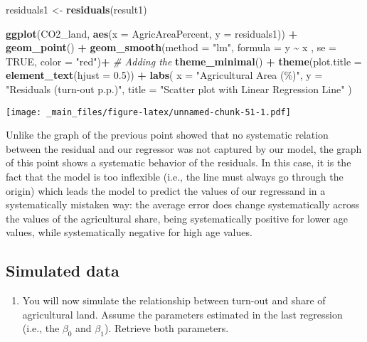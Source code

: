 \documentclass[
]{book}
\newenvironment{Shaded}{\begin{snugshade}}{\end{snugshade}}
\newcommand{\AttributeTok}[1]{\textcolor[rgb]{0.13,0.29,0.53}{#1}}
\newcommand{\CommentTok}[1]{\textcolor[rgb]{0.56,0.35,0.01}{\textit{#1}}}
\newcommand{\ConstantTok}[1]{\textcolor[rgb]{0.56,0.35,0.01}{#1}}
\newcommand{\FloatTok}[1]{\textcolor[rgb]{0.00,0.00,0.81}{#1}}
\newcommand{\FunctionTok}[1]{\textcolor[rgb]{0.13,0.29,0.53}{\textbf{#1}}}
\newcommand{\NormalTok}[1]{#1}
\newcommand{\OtherTok}[1]{\textcolor[rgb]{0.56,0.35,0.01}{#1}}
\newcommand{\SpecialCharTok}[1]{\textcolor[rgb]{0.81,0.36,0.00}{\textbf{#1}}}
\newcommand{\StringTok}[1]{\textcolor[rgb]{0.31,0.60,0.02}{#1}}
\providecommand{\tightlist}{%
  \setlength{\itemsep}{0pt}\setlength{\parskip}{0pt}}
\begin{document}
\begin{Shaded}
\begin{Highlighting}[]
\NormalTok{residuals1 }\OtherTok{\textless{}{-}} \FunctionTok{residuals}\NormalTok{(result1)}

\FunctionTok{ggplot}\NormalTok{(CO2\_land, }\FunctionTok{aes}\NormalTok{(}\AttributeTok{x =}\NormalTok{ AgricAreaPercent, }\AttributeTok{y =}\NormalTok{ residuals1)) }\SpecialCharTok{+}
  \FunctionTok{geom\_point}\NormalTok{() }\SpecialCharTok{+}
  \FunctionTok{geom\_smooth}\NormalTok{(}\AttributeTok{method =} \StringTok{"lm"}\NormalTok{, }\AttributeTok{formula =}\NormalTok{ y }\SpecialCharTok{\textasciitilde{}}\NormalTok{ x , }\AttributeTok{se =} \ConstantTok{TRUE}\NormalTok{, }\AttributeTok{color =} \StringTok{"red"}\NormalTok{)}\SpecialCharTok{+}  \CommentTok{\# Adding the}
  \FunctionTok{theme\_minimal}\NormalTok{() }\SpecialCharTok{+}
  \FunctionTok{theme}\NormalTok{(}\AttributeTok{plot.title =} \FunctionTok{element\_text}\NormalTok{(}\AttributeTok{hjust =} \FloatTok{0.5}\NormalTok{)) }\SpecialCharTok{+}
  \FunctionTok{labs}\NormalTok{(}
    \AttributeTok{x =} \StringTok{"Agricultural Area (\%)"}\NormalTok{,}
    \AttributeTok{y =} \StringTok{"Residuals (turn{-}out p.p.)"}\NormalTok{,}
    \AttributeTok{title =} \StringTok{"Scatter plot with Linear Regression Line"}
\NormalTok{  )}
\end{Highlighting}
\end{Shaded}

\texttt{[image: \_main\_files/figure-latex/unnamed-chunk-51-1.pdf]}

Unlike the graph of the previous point showed that no systematic relation between the residual and our regressor was not captured by our model, the graph of this point shows a systematic behavior of the residuals. In this case, it is the fact that the model is too inflexible (i.e., the line must always go through the origin) which leads the model to predict the values of our regressand in a systematically mistaken way: the average error does change systematically across the values of the agricultural share, being systematically positive for lower age values, while systematically negative for high age values.

\hypertarget{simulated-data}{%
\subsection{Simulated data}\label{simulated-data}}

\begin{enumerate}
\def\labelenumi{\roman{enumi}.}
\tightlist
\item
  You will now simulate the relationship between turn-out and share of agricultural land. Assume the parameters estimated in the last regression (i.e., the \(\beta_0\) and \(\beta_1\)). Retrieve both parameters.
\end{enumerate}
\end{document}
